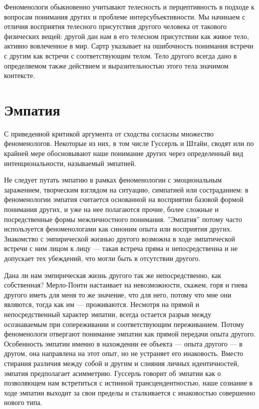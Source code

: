 \documentclass[11pt]{book}
\begin{document}
Феноменологи обыкновенно учитывают телесность и перцептивность в подходе к вопросам понимания других и проблеме интерсубъективности. Мы начинаем с отличия восприятия телесного присутствия другого человека от такового физических вещей: другой дан нам в его телесном присутствии как живое тело, активно вовлеченное в мир. Сартр указывает на ошибочность понимания встречи с другим как встречи с соответствующим телом. Тело другого всегда дано в определяемом также действием и выразительностью этого тела значимом контексте.

\section{Эмпатия}

С приведенной критикой аргумента от сходства согласны множество феноменологов. Некоторые из них, в том числе Гуссерль и Штайн, сводят или по крайней мере обосновывают наше понимание других через определенный вид интенциональности, называемый эмпатией.

Не следует путать эмпатию в рамках феноменологии с эмоциональным заражением, творческим взглядом на ситуацию, симпатией или состраданием: в феноменологии эмпатия считается основанной на восприятии базовой формой понимания других, и уже на нее полагаются прочие, более сложные и посредственные формы межличностного понимания. ''Эмпатия'' потому часто используется феноменологами как синоним опыта или восприятия других. Знакомство с эмпирической жизнью другого возможна в ходе эмпатической встречи с ним лицом к лицу --- такая встреча пряма и непосредственна и не допускает тех убеждений, что могли быть в отсутствии другого.

Дана ли нам эмпирическая жизнь другого так же непосредственно, как собственная? Мерло-Понти настаивает на невозможности, скажем, горя и гнева другого иметь для меня то же значение, что для него, потому что мне они являются, тогда как им --- проживаются. Несмотря на прямой и непосредственный характер эмпатии, всегда остается разрыв между осознаваемым при сопереживании и соответствующим переживанием. Потому феноменологи отвергают понимание эмпатии как прямой передачи опыта другого. Особенность эмпатии именно в нахождении ее объекта --- опыта другого --- в другом, она направлена на этот опыт, но не устраняет его инаковость. Вместо стирания различия между собой и другим и слияния личных идентичностей, эмпатия предполагает асимметрию. Гуссерль говорит об эмпатии как о позволяющем нам встретиться с истинной трансцендентностью, наше сознание в ходе эмпатии выходит за свои пределы и сталкивается с инаковостью совершенно нового типа.
\end{document}
